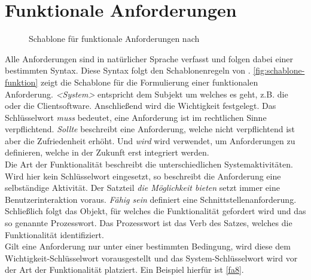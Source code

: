 \section{Funktionale Anforderungen}
\label{sec:funktionale}

\begin{figure}
    \centering
    
    \caption{Schablone für funktionale Anforderungen nach }
    \label{fig:schablone-funktion}
\end{figure}

Alle Anforderungen sind in natürlicher Sprache verfasst und folgen dabei einer bestimmten Syntax. Diese
Syntax folgt den Schablonenregeln von . \autoref{fig:schablone-funktion} zeigt die
Schablone für die Formulierung einer funktionalen Anforderung. \emph{<System>} entspricht dem 
Subjekt um welches
es geht, z.B. die \shst{} oder die Clientsoftware. Anschließend wird die Wichtigkeit festgelegt. Das 
Schlüsselwort \emph{muss} bedeutet, eine Anforderung ist im rechtlichen Sinne verpflichtend. \emph{Sollte} 
beschreibt eine Anforderung, welche nicht verpflichtend ist aber die Zufriedenheit erhöht. Und \emph{wird}
wird verwendet, um Anforderungen zu definieren, welche in der Zukunft erst integriert werden.\\
Die Art der Funktionalität beschreibt die unterschiedlichen Systemaktivitäten. Wird hier kein Schlüsselwort
eingesetzt, so beschreibt die Anforderung eine selbständige Aktivität. Der Satzteil \emph{die Möglichkeit bieten}
setzt immer eine Benutzerinteraktion voraus. \emph{Fähig sein} definiert eine Schnittstellenanforderung.\\
Schließlich folgt das Objekt, für welches die Funktionalität gefordert wird und das so genannte Prozesswort. Das
Prozesswort ist das Verb des Satzes, welches die Funktionalität identifiziert.\\
Gilt eine Anforderung nur unter einer bestimmten Bedingung, wird diese dem Wichtigkeit-Schlüsselwort vorausgestellt und
das System-Schlüsselwort wird vor der Art der Funktionalität platziert. Ein Beispiel hierfür ist \ref{fa8}.

